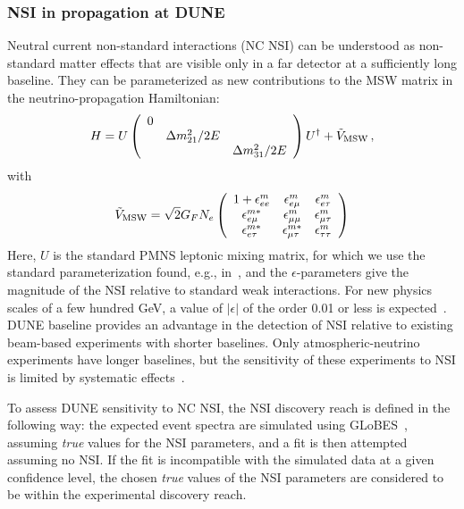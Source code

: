 \subsubsection{NSI in propagation at DUNE}
Neutral current non-standard interactions (NC NSI) can be understood as non-standard
matter effects that are visible only in a far detector at a sufficiently long baseline. They can be parameterized as new contributions
to the MSW matrix in the neutrino-propagation Hamiltonian:
\begin{equation}
  H = U \left( \begin{array}{ccc}
           0 &                    & \\
             & \Delta m_{21}^2/2E & \\
             &                    & \Delta m_{31}^2/2E
         \end{array} \right) U^\dag + \tilde{V}_{\rm MSW} \,,
\end{equation}
with
\begin{equation}
  \tilde{V}_{\rm MSW} = \sqrt{2} G_F N_e
\left(
  \begin{array}{ccc}
    1 + \epsilon^m_{ee}       & \epsilon^m_{e\mu}       & \epsilon^m_{e\tau}  \\
        \epsilon^{m*}_{e\mu}  & \epsilon^m_{\mu\mu}     & \epsilon^m_{\mu\tau} \\
        \epsilon^{m*}_{e\tau} & \epsilon^{m*}_{\mu\tau} & \epsilon^m_{\tau\tau}
  \end{array} 
\right)
\label{eq:epsmatrix}
\end{equation}
Here, $U$ is the standard PMNS leptonic mixing matrix, for which we use the standard parameterization found, e.g., in~\cite{Agashe:2014kda}, and the $\epsilon$-parameters give the
magnitude of the NSI relative to standard weak interactions.  For new physics
scales of a few hundred GeV,  a value of $|\epsilon|$ of the order
0.01 or less is
expected~\cite{Davidson:2003ha,GonzalezGarcia:2007ib,Biggio:2009nt}. DUNE
baseline provides an advantage in the detection of NSI relative
to existing beam-based experiments with shorter baselines.
Only atmospheric-neutrino experiments have longer baselines, but the sensitivity
of these experiments to NSI is limited by systematic effects~\cite{Adams:2013qkq}.

To assess DUNE sensitivity to NC NSI, the NSI discovery reach
is defined in the following way: the expected event spectra are
simulated using GLoBES~\cite{Huber:2004ka,Huber:2007ji}, assuming \emph{true} values for the NSI
parameters, and a fit is then attempted assuming no NSI. If the fit is
incompatible with the simulated data at a given confidence level,
the chosen \emph{true} values of the NSI parameters are considered to be within the experimental discovery reach.

